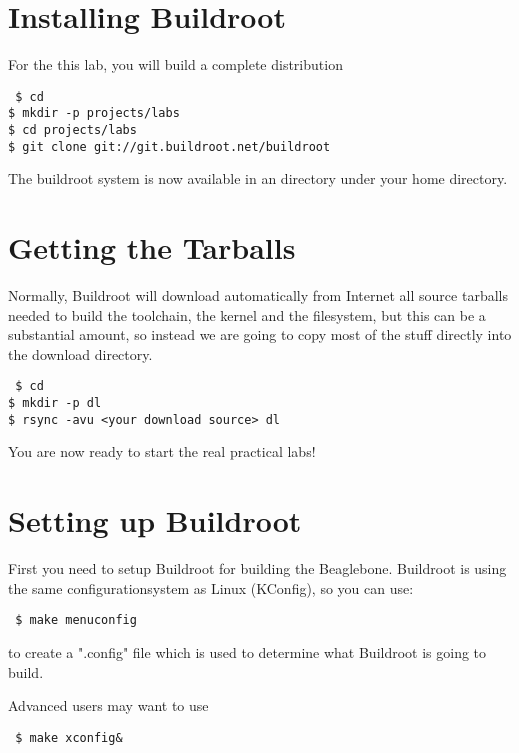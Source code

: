 
\section{Installing Buildroot}

For the this lab, you will build a complete distribution

{\small
{\tt
\$ cd\\
\$ mkdir -p projects/labs\\
\$ cd projects/labs\\
\$ git clone git://git.buildroot.net/buildroot\\
}
}

The buildroot system is now available in an  directory
under your home directory.

\section{Getting the Tarballs}

Normally, Buildroot will download automatically from Internet all source tarballs needed
to build the toolchain, the kernel and the filesystem, but this can be a substantial amount, so instead  we are going to copy most of the stuff directly into the  download directory.

{\small
{\tt
\$ cd\\
\$ mkdir -p dl\\
\$ rsync -avu <your download source> dl\\
}
}

You are now ready to start the real practical labs!

\section{Setting up Buildroot}

First you need to setup Buildroot for building the Beaglebone.
Buildroot is using the same configurationsystem as Linux (KConfig),
so you can use:

{\small
{\tt
\$ make menuconfig\\
}
}

to create a ".config" file which is used to determine what Buildroot
is going to build.

Advanced users may want to use

{\small
{\tt
\$ make xconfig\&\\
}
}

